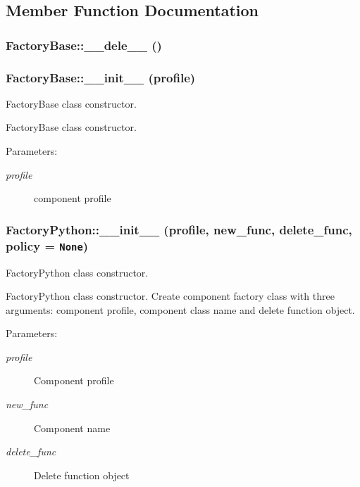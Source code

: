 \subsection{Member Function Documentation}
\subsubsection{\setlength{\rightskip}{0pt plus 5cm}Factory\-Base::\_\-\_\-dele\_\-\_\- ()\hspace{0.3cm}{\tt  [inherited]}}\label{classFactoryBase_FactoryPythona4}


\subsubsection{\setlength{\rightskip}{0pt plus 5cm}Factory\-Base::\_\-\_\-init\_\-\_\- (profile)\hspace{0.3cm}{\tt  [inherited]}}\label{classFactoryBase_FactoryPythona3}


Factory\-Base class constructor. 

Factory\-Base class constructor. \begin{Desc}
\item[Parameters:]
\begin{description}
\item[{\em profile}]component profile\end{description}
\end{Desc}
\subsubsection{\setlength{\rightskip}{0pt plus 5cm}Factory\-Python::\_\-\_\-init\_\-\_\- (profile, new\_\-func, delete\_\-func, policy = {\tt None})}\label{classFactoryPython_FactoryPythona0}


Factory\-Python class constructor. 

Factory\-Python class constructor. Create component factory class with three arguments: component profile, component class name and delete function object. \begin{Desc}
\item[Parameters:]
\begin{description}
\item[{\em profile}]Component profile \item[{\em new\_\-func}]Component name \item[{\em delete\_\-func}]Delete function object\end{description}
\end{Desc}
